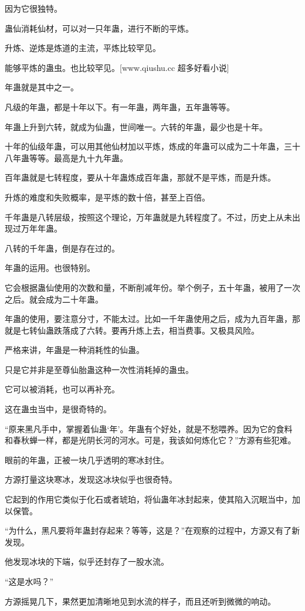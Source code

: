 \begin{this_body}
因为它很独特。

蛊仙消耗仙材，可以对一只年蛊，进行不断的平炼。

升炼、逆炼是炼道的主流，平炼比较罕见。

能够平炼的蛊虫。也比较罕见。[www.qiushu.cc 超多好看小说]

年蛊就是其中之一。

凡级的年蛊，都是十年以下。有一年蛊，两年蛊，五年蛊等等。

年蛊上升到六转，就成为仙蛊，世间唯一。六转的年蛊，最少也是十年。

十年的仙级年蛊，可以用其他仙材加以平炼，炼成的年蛊可以成为二十年蛊，三十八年蛊等等。最高是九十九年蛊。

百年蛊就是七转程度，要从十年蛊炼成百年蛊，那就不是平炼，而是升炼。

升炼的难度和失败概率，是平炼的数十倍，甚至上百倍。

千年蛊是八转层级，按照这个理论，万年蛊就是九转程度了。不过，历史上从未出现过万年年蛊。

八转的千年蛊，倒是存在过的。

年蛊的运用。也很特别。

它会根据蛊仙使用的次数和量，不断削减年份。举个例子，五十年蛊，被用了一次之后。就会成为二十年蛊。

年蛊的使用，要注意分寸，不能太过。比如一千年蛊使用之后，成为九百年蛊，那就是七转仙蛊跌落成了六转。要再升炼上去，相当费事。又极具风险。

严格来讲，年蛊是一种消耗性的仙蛊。

只是它并非是至尊仙胎蛊这种一次性消耗掉的蛊虫。

它可以被消耗，也可以再补充。

这在蛊虫当中，是很奇特的。

“原来黑凡手中，掌握着仙蛊‘年’。年蛊有个好处，就是不愁喂养。因为它的食料和春秋蝉一样，都是光阴长河的河水。可是，我该如何炼化它？”方源有些犯难。

眼前的年蛊，正被一块几乎透明的寒冰封住。

方源打量这块寒冰，发现这冰块似乎也很奇特。

它起到的作用它类似于化石或者琥珀，将仙蛊年冰封起来，使其陷入沉眠当中，加以保管。

“为什么，黑凡要将年蛊封存起来？等等，这是？”在观察的过程中，方源又有了新发现。

他发现冰块的下端，似乎还封存了一股水流。

“这是水吗？”

方源摇晃几下，果然更加清晰地见到水流的样子，而且还听到微微的响动。


\end{this_body}
